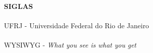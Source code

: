\pagebreak


\begin{center}
\textbf{SIGLAS}
\end{center}
      \vspace{0.5cm}

\paragraph{}UFRJ - Universidade Federal do Rio de Janeiro
\paragraph{}WYSIWYG - \textit{What you see is what you get}


\pagebreak








